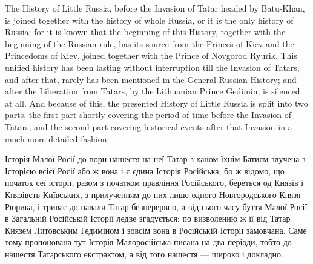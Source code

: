  
 
 
 
 

The History of Little Russia, before the Invasion of Tatar headed by Batu-Khan,
is joined together with the history of whole Russia, or it is the only history
of Russia; for it is known that the beginning of this History, together with
the beginning of the Russian rule, has its source from the Princes of Kiev and
the Princedoms of Kiev, joined together with the Prince of Novgorod Ryurik.
This unified history has been lasting without interruption till the Invasion of
Tatars, and after that, rarely has been mentioned in the General Russian
History; and after the Liberation from Tatars, by the Lithuanian Prince
Gedimin, is silenced at all.  And because of this, the presented History of Little
Russia is split into two parts, the first part shortly covering
the period of time before the Invasion of Tatars, and the second part covering historical 
events after that Invasion in a much more detailed fashion.

Історія Малої Росії до пори нашестя на неї Татар з ханом їхнім Батиєм злучена з
Історією всієї Росії або ж вона і є єдина Історія Російська; бо ж відомо, що
початок сеї історії, разом з початком правління Російського, береться од Князів
і Князівств Київських, з прилученням до них лише одного Новгородського Князя
Рюрика, і триває до навали Татар безперервно, а від сього часу буття Малої
Росії в Загальній Російській Історії ледве згадується; по визволенню ж її від
Татар Князем Литовським Гедиміном і зовсім вона в Російській Історії замовчана.
Саме тому пропонована тут Історія Малоросійська писана на два періоди, тобто до
нашестя Татарського екстрактом, а від того нашестя — широко і докладно.
